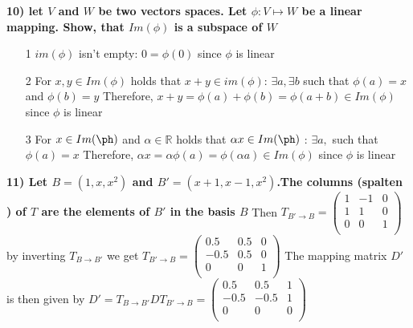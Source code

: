 \documentclass[7pt,landscape, margin = 0.1mm]{article}
\begin{document}
\begin{multicols}{4}
\begin{flushleft}
\textbf{10) let $V$ and $W $ be two vectors spaces. Let $\phi : V \mapsto W$ be a linear mapping. Show, that $Im(\phi)$ is a subspace of $W$}
\begin{itemize}
\item[1] $ im(\phi)$ isn't empty: $0 = \phi(0) $ since $ \phi $ is linear
\item[2]For $x,y \in Im(\phi)$ holds that $x+y \in im(\phi) $: $\exists a, \exists b$ such that $ \phi(a)=x $ and $\phi(b) = y$ Therefore, $x+y = \phi(a)+ \phi(b) =\phi(a+b)\in Im(\phi)$ since $\phi $ is linear
\item[3] For $x \in Im(\ph) $ and $\alpha \in \mathbb{R}  $ holds that $\alpha x \in Im(\ph)  $ : $\exists a, $ such that $ \phi(a)=x $ Therefore, $\alpha x =  \alpha \phi(a) =\phi(\alpha a)\in Im(\phi)$ since $\phi $ is linear
\end{itemize}
\textbf{11) Let $B = (1,x,x^2) $ and $B' = (x+1, x-1, x^2) $.The columns (spalten ) of $T$ are the elements of $B' $ in the basis $B $} Then $T_{B' \rightarrow B} = \begin{pmatrix}
1 & -1 & 0 \\
1 & 1 &  0\\
 0& 0 &  1\\
\end{pmatrix}$ by inverting $T_{B \rightarrow B'}  $ we get $T_{B' \rightarrow B} = \begin{pmatrix}
0.5 & 0.5 & 0 \\
-0.5 & 0.5 &  0\\
 0& 0 &  1\\
\end{pmatrix}$  The mapping matrix $D' $ is then given by $D' =T_{B \rightarrow B'} D T_{B' \rightarrow B}  = \begin{pmatrix}
0.5 & 0.5 & 1 \\
-0.5 & -0.5 &  1\\
 0& 0 &  0\\
\end{pmatrix}  $


\scriptsize

\end{flushleft}
\end{multicols}
\end{document}
